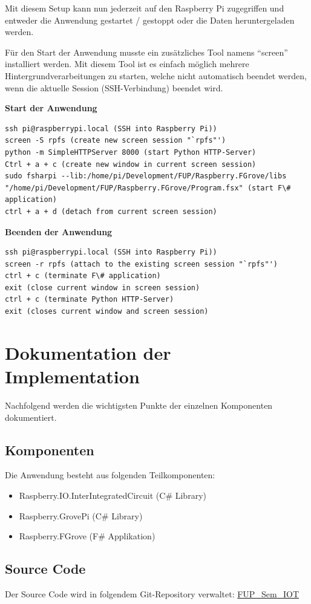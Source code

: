 Mit diesem Setup kann nun jederzeit auf den Raspberry Pi zugegriffen und entweder die Anwendung gestartet / gestoppt oder die Daten heruntergeladen werden.

Für den Start der Anwendung musste ein zusätzliches Tool namens "`screen"' installiert werden. Mit diesem Tool ist es einfach möglich mehrere Hintergrundverarbeitungen zu starten, welche nicht automatisch beendet werden, wenn die aktuelle Session (SSH-Verbindung) beendet wird.

\textbf{Start der Anwendung}
\begin{lstlisting}
ssh pi@raspberrypi.local (SSH into Raspberry Pi))
screen -S rpfs (create new screen session "`rpfs"')
python -m SimpleHTTPServer 8000 (start Python HTTP-Server)
Ctrl + a + c (create new window in current screen session)
sudo fsharpi --lib:/home/pi/Development/FUP/Raspberry.FGrove/libs "/home/pi/Development/FUP/Raspberry.FGrove/Program.fsx" (start F\# application)
ctrl + a + d (detach from current screen session)
\end{lstlisting}

\textbf{Beenden der Anwendung}
\begin{lstlisting}
ssh pi@raspberrypi.local (SSH into Raspberry Pi))
screen -r rpfs (attach to the existing screen session "`rpfs"')
ctrl + c (terminate F\# application)
exit (close current window in screen session)
ctrl + c (terminate Python HTTP-Server)
exit (closes current window and screen session)
\end{lstlisting}

\section{Dokumentation der Implementation}\label{sec:AnalyseCollection:ImplDoc}
Nachfolgend werden die wichtigsten Punkte der einzelnen Komponenten dokumentiert.

\subsection{Komponenten}
Die Anwendung besteht aus folgenden Teilkomponenten:
\begin{itemize}
\item Raspberry.IO.InterIntegratedCircuit (C\# Library)
\item Raspberry.GrovePi (C\# Library)
\item Raspberry.FGrove (F\# Applikation)
\end{itemize}

\subsection{Source Code}
Der Source Code wird in folgendem Git-Repository verwaltet: \hyperlink{https://github.com/Liechtathlet/FUP_Sem_IOT}{FUP\_Sem\_IOT}

